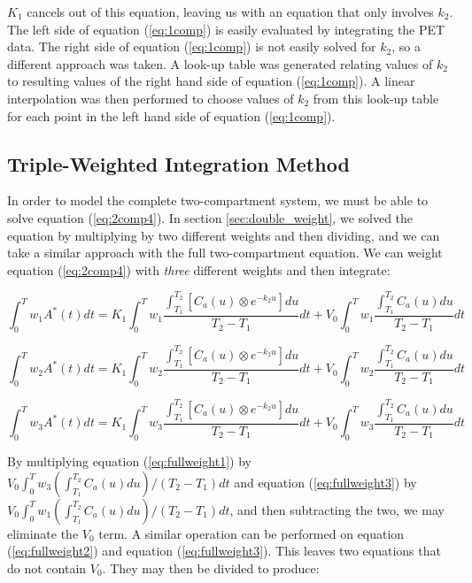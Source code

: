 $K_{1}$ cancels out of this equation, leaving us with an equation
that only involves $k_{2}$.  The left side of equation
(\ref{eq:1comp}) is easily evaluated by integrating the PET data.
The right side of equation (\ref{eq:1comp}) is not easily solved for
$k_{2}$, so a different approach was taken.  A look-up table was
generated relating values of $k_{2}$ to resulting values of the
right hand side of equation (\ref{eq:1comp}).  A linear
interpolation was then performed to choose values of $k_{2}$ from
this look-up table for each point in the left hand side of equation
(\ref{eq:1comp}).


\subsection{Triple-Weighted Integration Method}

In order to model the complete two-compartment system, we must be able
to solve equation (\ref{eq:2comp4}).  In section
\ref{sec:double_weight},
we solved the equation by multiplying by two different weights and
then dividing, and we can take a similar approach with the full
two-compartment equation.  We can weight equation (\ref{eq:2comp4})
with {\em three} different weights and then integrate:

\begin{equation}
\int_{0}^{T} w_{1}A^{*}(t)dt = K_{1} \int_{0}^{T} w_{1}
\frac{\int_{T_1}^{T_2} \left[ C_{a}(u) \otimes e^{-k_{2}u} \right]
du}{T_2 - T_1} dt + V_{0} \int_{0}^{T}w_{1} \frac{\int_{T_1}^{T_2}
C_{a}(u) du}{T_2 - T_1} dt \label{eq:fullweight1}
\end{equation}

\begin{equation}
\int_{0}^{T} w_{2}A^{*}(t)dt = K_{1} \int_{0}^{T} w_{2}
\frac{\int_{T_1}^{T_2} \left[ C_{a}(u) \otimes e^{-k_{2}u} \right]
du}{T_2 - T_1} dt + V_{0} \int_{0}^{T}w_{2} \frac{\int_{T_1}^{T_2}
C_{a}(u) du}{T_2 - T_1} dt \label{eq:fullweight2}
\end{equation}

\begin{equation}
\int_{0}^{T} w_{3}A^{*}(t)dt = K_{1} \int_{0}^{T} w_{3}
\frac{\int_{T_1}^{T_2} \left[ C_{a}(u) \otimes e^{-k_{2}u} \right]
du}{T_2 - T_1} dt + V_{0} \int_{0}^{T}w_{3} \frac{\int_{T_1}^{T_2}
C_{a}(u) du}{T_2 - T_1} dt \label{eq:fullweight3}
\end{equation}

By multiplying equation (\ref{eq:fullweight1}) by $V_{0}
\int_{0}^{T} w_{3} {(\int_{T_1}^{T_2}C_{a}(u)du)}/{(T_2 - T_1)} dt$
and equation (\ref{eq:fullweight3}) by $V_{0} \int_{0}^{T} w_{1}
{(\int_{T_1}^{T_2}C_{a}(u)du)}/{(T_2 - T_1)} dt$, and then
subtracting the two, we may eliminate the $V_{0}$ term.  A similar
operation can be performed on equation (\ref{eq:fullweight2}) and
equation (\ref{eq:fullweight3}).  This leaves two equations that do
not contain $V_{0}$.  They may then be divided to produce:

